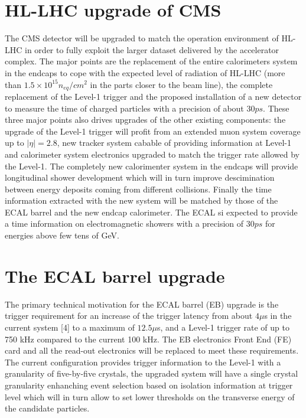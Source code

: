 \section{HL-LHC upgrade of CMS}
\label{upgrade_cms}
The CMS detector will be upgraded to match the operation environment of HL-LHC in order to fully exploit the
larger dataset delivered by the accelerator complex.
The major points are
the replacement of the entire calorimeters system in the endcaps to cope with the expected level of radiation
of HL-LHC (more than $1.5\times10^{15} n_{eq}/cm^{2}$ in the parts closer to the beam line),
the complete replacement of the Level-1 trigger and the proposed installation of a new detector to measure the
time of charged particles with a precision of about $30 ps$. These three major points also drives upgrades of
the other existing components: the upgrade of the Level-1 trigger will profit from an extended
muon system coverage up to $|\eta| = 2.8$, new tracker system cabable of providing information at
Level-1 and calorimeter system electronics upgraded to match the trigger rate allowed by the Level-1.
The completely new calorimenter system in the endcaps will provide longitudinal shower development which will
in turn improve descimination between energy deposits coming from different collisions.
Finally the time information extracted with the new system will be matched by those of the ECAL barrel and the new
endcap calorimeter. The ECAL si expected to provide a time information on electromagnetic showers
with a precision of $30 ps$ for energies above few tens of GeV.

\section{The ECAL barrel upgrade}
The primary technical motivation for the ECAL barrel (EB) upgrade is the trigger requirement for
an increase of the trigger latency from about $4\mu$s in the current system [4] to a maximum of $12.5\mu$s,
and a Level-1 trigger rate of up to 750 kHz compared to the current 100 kHz.
The EB electronics Front End (FE) card and all the read-out electronics will be replaced to
meet these requirements. The current configuration provides trigger information to the Level-1
with a granularity of five-by-five crystals, the upgraded system will have a single crystal granularity
enhanching event selection based on isolation information at trigger level which will in turn allow
to set lower thresholds on the transverse energy of the candidate particles.

